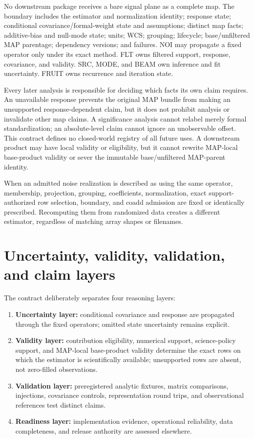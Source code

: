 \documentclass[10pt]{article}
\begin{document}
No downstream package receives a bare signal plane as a complete map. The
boundary includes the estimator and normalization identity; response state;
conditional covariance/formal-weight state and assumptions; distinct map facts;
additive-bias and null-mode state; units; WCS; grouping; lifecycle;
base/unfiltered MAP parentage; dependency versions; and failures.
\SCIMapNOIOwnershipStatement{} NOI may propagate a fixed
operator only under its exact method. FLT
owns filtered support, response, covariance, and validity. SRC, MODE, and BEAM
own inference and fit uncertainty. FRUIT owns recurrence and iteration state.

Every later analysis is responsible for deciding which facts its own claim
requires. An unavailable response prevents the original MAP bundle from making
an unsupported response-dependent claim, but it does not prohibit analysis or
invalidate other map claims. A significance analysis cannot relabel merely
formal standardization; an absolute-level claim cannot ignore an unobservable
offset. This contract defines no closed-world registry of all future uses. A
downstream product may have local validity or eligibility, but it cannot
rewrite MAP-local base-product validity or sever the immutable base/unfiltered
MAP-parent identity.

When an admitted noise realization is described as using the same operator,
membership, projection, grouping, coefficients, normalization, exact
support-authorized row selection, boundary, and coadd admission are fixed or
identically prescribed. Recomputing them from randomized data creates a
different estimator, regardless of matching array shapes or filenames.

\clearpage
\section{Uncertainty, validity, validation, and claim layers}

The contract deliberately separates four reasoning layers:

\begin{enumerate}
\item \textbf{Uncertainty layer:} conditional covariance and response are
propagated through the fixed operators; omitted state uncertainty remains
explicit.
\item \textbf{Validity layer:} contribution eligibility, numerical support,
science-policy support, and MAP-local base-product validity determine the exact rows on
which the estimator is scientifically available; unsupported rows are absent,
not zero-filled observations.
\item \textbf{Validation layer:} preregistered analytic fixtures, matrix
comparisons, injections, covariance controls, representation round trips, and
observational references test distinct claims.
\item \textbf{Readiness layer:} implementation evidence, operational
reliability, data completeness, and release authority are assessed elsewhere.
\end{enumerate}
\end{document}
